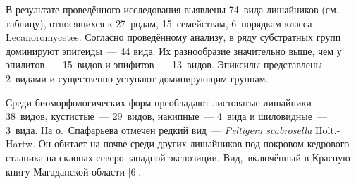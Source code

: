 В результате проведённого исследования выявлены 74~вида лишайников (см. таблицу), относящихся к 27~родам, 15~семействам, 6~порядкам класса Lecanoromycetes. Согласно проведённому анализу, в ряду субстратных групп доминируют эпигеиды~--- 44 вида. Их разнообразие значительно выше, чем у эпилитов~--- 15~видов и эпифитов~--- 13~видов. Эпиксилы представлены 2~видами и существенно уступают доминирующим группам.

Среди биоморфологических форм преобладают листоватые лишайники~--- 38~видов, кустистые~--- 29~видов, накипные~--- 4~вида и шиловидные~--- 3~вида. На о.~Спафарьева отмечен редкий вид~--- \textit{Peltigera scabrosella} Holt.-Hartw. Он обитает на почве среди других лишайников под покровом кедрового стланика на склонах северо-западной экспозиции. Вид,~включённый в Красную книгу Магаданской области [6].

